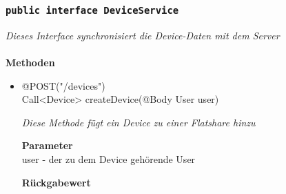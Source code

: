 	\subsubsection{\texttt{public interface DeviceService }}
\textit{Dieses Interface synchronisiert die Device-Daten mit dem Server}\\
\\
	\textbf{Methoden} \\
		\begin{itemize}
		\item{@POST("/devices") \\ Call<Device> createDevice(@Body User user)}

		\textit{Diese Methode fügt ein Device zu einer Flatshare hinzu}

		\textbf{Parameter} \\
	 user - der zu dem Device gehörende User 

		\textbf{Rückgabewert} \\


	 \end{itemize}